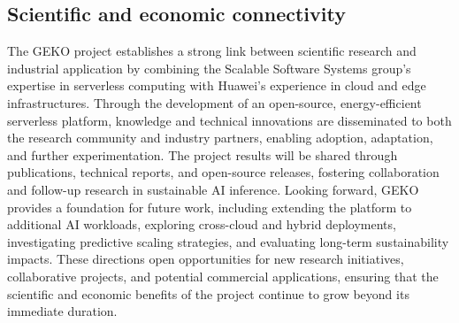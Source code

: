 \subsection{Scientific and economic connectivity}
\label{sec:verwertungsplan:anschluss}


The GEKO project establishes a strong link between scientific research and industrial application by combining the Scalable Software Systems group's expertise in serverless computing with Huawei's experience in cloud and edge infrastructures.
Through the development of an open-source, energy-efficient serverless platform, knowledge and technical innovations are disseminated to both the research community and industry partners, enabling adoption, adaptation, and further experimentation.
The project results will be shared through publications, technical reports, and open-source releases, fostering collaboration and follow-up research in sustainable AI inference.
Looking forward, GEKO provides a foundation for future work, including extending the platform to additional AI workloads, exploring cross-cloud and hybrid deployments, investigating predictive scaling strategies, and evaluating long-term sustainability impacts.
These directions open opportunities for new research initiatives, collaborative projects, and potential commercial applications, ensuring that the scientific and economic benefits of the project continue to grow beyond its immediate duration.
